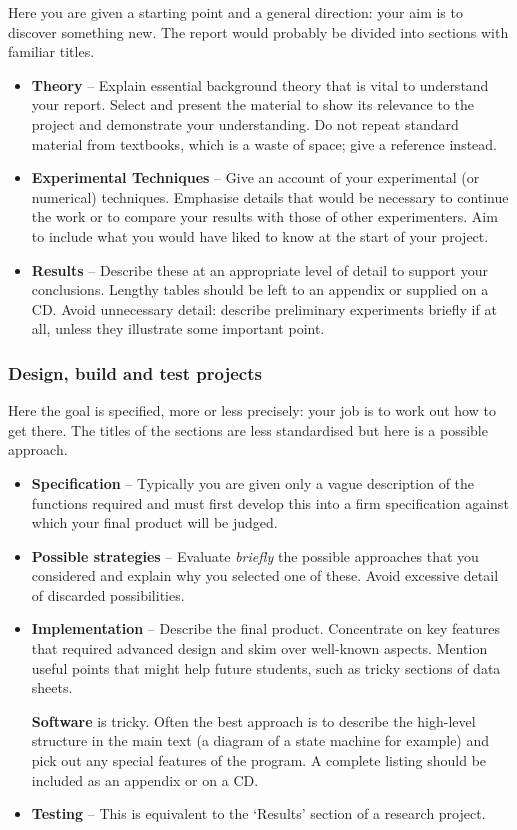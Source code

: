 \documentclass[a4paper,12pt]{article}
\begin{document}
Here you are given a starting point and a general direction: your aim is to discover something new. The report would probably be divided into sections with familiar titles.
\begin{itemize}
\item
\textbf{Theory} -- 
Explain essential background theory that is vital to understand your report. Select and present the material to show its relevance to the project and demonstrate your understanding. Do not repeat standard material from textbooks, which is a waste of space; give a reference instead. 

\item
\textbf{Experimental Techniques} --
Give an account of your experimental (or numerical) techniques. Emphasise details that would be necessary to continue the work or to compare your results with those of other experimenters. Aim to include what you would have liked to know at the start of your project.

\item
\textbf{Results} --
Describe these at an appropriate level of detail to support your conclusions. Lengthy tables should be left to an appendix or supplied on a CD. Avoid unnecessary detail: describe preliminary experiments briefly if at all, unless they illustrate some important point.
\end{itemize}


\subsubsection{Design, build and test projects}

Here the goal is specified, more or less precisely: your job is to work out how to get there. The titles of the sections are less standardised but here is a possible approach.
\begin{itemize}
\item
\textbf{Specification} --
Typically you are given only a vague description of the functions required and must first develop this into a firm specification against which your final product will be judged.
\item
\textbf{Possible strategies} --
Evaluate \emph{briefly} the possible approaches that you considered 
and explain why you selected one of these. 
Avoid excessive detail of discarded possibilities.
\item
\textbf{Implementation} --
Describe the final product. Concentrate on key features that required advanced design and skim over well-known aspects. Mention useful points that might help future students, such as tricky sections of data sheets.

\textbf{Software} is tricky. Often the best approach is to describe the high-level structure in the main text (a diagram of a state machine for example) and pick out any special features of the program. A complete listing should be included as an appendix or on a CD.
\item
\textbf{Testing} --
This is equivalent to the `Results' section of a research project. 
\end{itemize}
\end{document}
